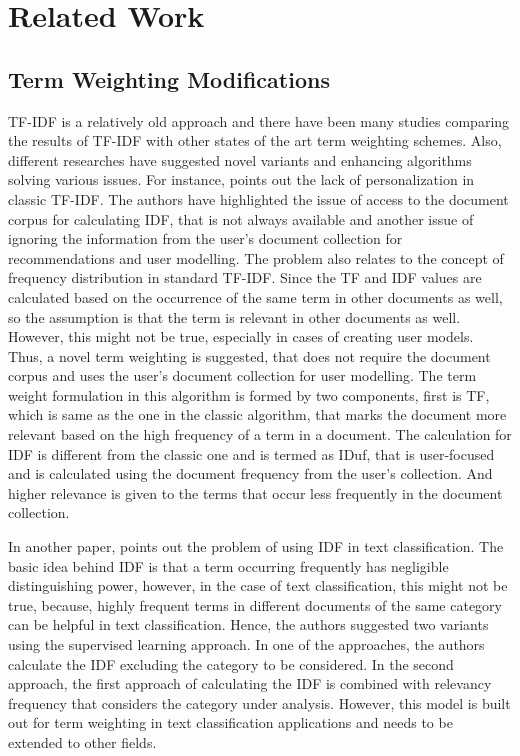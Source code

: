 
\chapter{Related Work}

	\section{Term Weighting Modifications}
	TF-IDF is a relatively old approach and there have been many studies comparing the results of TF-IDF with other states of the art term weighting schemes. Also, different researches have suggested novel variants and enhancing algorithms solving various issues. For instance, \cite{RN23} points out the lack of personalization in classic TF-IDF. The authors have highlighted the issue of access to the document corpus for calculating IDF, that is not always available and another issue of ignoring the information from the user’s document collection for recommendations and user modelling. The problem also relates to the concept of frequency distribution in standard TF-IDF. Since the TF and IDF values are calculated based on the occurrence of the same term in other documents as well, so the assumption is that the term is relevant in other documents as well. However, this might not be true, especially in cases of creating user models. Thus, a novel term weighting is suggested, that does not require the document corpus and uses the user’s document collection for user modelling. The term weight formulation in this algorithm is formed by two components, first is TF, which is same as the one in the classic algorithm, that marks the document more relevant based on the high frequency of a term in a document. The calculation for IDF is different from the classic one and is termed as IDuf, that is user-focused and is calculated using the document frequency from the user's collection. And higher relevance is given to the terms that occur less frequently in the document collection.

	In another paper, \cite{RN24} points out the problem of using IDF in text classification. The basic idea behind IDF is that a term occurring frequently has negligible distinguishing power, however, in the case of text classification, this might not be true, because, highly frequent terms in different documents of the same category can be helpful in text classification. Hence, the authors suggested two variants using the supervised learning approach. In one of the approaches, the authors calculate the IDF excluding the category to be considered. In the second approach, the first approach of calculating the IDF is combined with relevancy frequency that considers the category under analysis. However, this model is built out for term weighting in text classification applications and needs to be extended to other fields.
	
